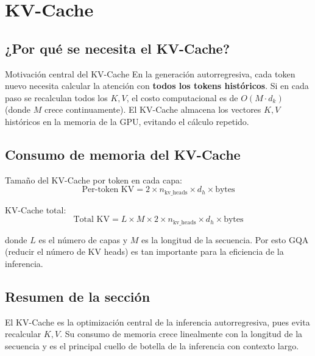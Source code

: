 \section{KV-Cache}

\subsection{¿Por qué se necesita el KV-Cache?}

\begin{importantbox}{Motivación central del KV-Cache}
En la generación autorregresiva, cada token nuevo necesita calcular la atención con \textbf{todos los tokens históricos}. Si en cada paso se recalculan todos los $K, V$, el costo computacional es de $O(M \cdot d_k)$ (donde $M$ crece continuamente). El KV-Cache almacena los vectores $K, V$ históricos en la memoria de la GPU, evitando el cálculo repetido.
\end{importantbox}

\subsection{Consumo de memoria del KV-Cache}

Tamaño del KV-Cache por token en cada capa:
$$
\text{Per-token KV} = 2 \times n_{\text{kv\_heads}} \times d_h \times \text{bytes}
$$

KV-Cache total:
$$
\text{Total KV} = L \times M \times 2 \times n_{\text{kv\_heads}} \times d_h \times \text{bytes}
$$

donde $L$ es el número de capas y $M$ es la longitud de la secuencia. Por esto GQA (reducir el número de KV heads) es tan importante para la eficiencia de la inferencia.

\subsection{Resumen de la sección}

El KV-Cache es la optimización central de la inferencia autorregresiva, pues evita recalcular $K, V$. Su consumo de memoria crece linealmente con la longitud de la secuencia y es el principal cuello de botella de la inferencia con contexto largo.
